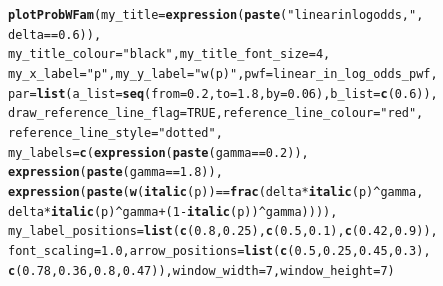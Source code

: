 \documentclass{article}\usepackage[]{graphicx}\usepackage[]{color}
\makeatletter
\newcommand{\hlnum}[1]{\textcolor[rgb]{0.686,0.059,0.569}{#1}}%
\newcommand{\hlstr}[1]{\textcolor[rgb]{0.192,0.494,0.8}{#1}}%
\newcommand{\hlopt}[1]{\textcolor[rgb]{0,0,0}{#1}}%
\newcommand{\hlstd}[1]{\textcolor[rgb]{0.345,0.345,0.345}{#1}}%
\newcommand{\hlkwc}[1]{\textcolor[rgb]{0.333,0.667,0.333}{#1}}%
\newcommand{\hlkwd}[1]{\textcolor[rgb]{0.737,0.353,0.396}{\textbf{#1}}}%
\newenvironment{kframe}{%
 \def\at@end@of@kframe{}%
 \ifinner\ifhmode%
  \def\at@end@of@kframe{\end{minipage}}%
  \begin{minipage}{\columnwidth}%
 \fi\fi%
 \def\FrameCommand##1{\hskip\@totalleftmargin \hskip-\fboxsep
 \colorbox{shadecolor}{##1}\hskip-\fboxsep
     \hskip-\linewidth \hskip-\@totalleftmargin \hskip\columnwidth}%
 \MakeFramed {\advance\hsize-\width
   \@totalleftmargin\z@ \linewidth\hsize
   \@setminipage}}%
 {\par\unskip\endMakeFramed%
 \at@end@of@kframe}
\newenvironment{knitrout}{}{} %
\makeatother
\begin{document}
\begin{knitrout}
\color{fgcolor}\begin{kframe}
\begin{alltt}
\hlkwd{plotProbWFam}\hlstd{(}\hlkwc{my_title}\hlstd{=}\hlkwd{expression}\hlstd{(}\hlkwd{paste}\hlstd{(}\hlstr{"linear in log odds,  "}\hlstd{,}
        \hlstd{delta} \hlopt{==} \hlnum{0.6}\hlstd{)),}
        \hlkwc{my_title_colour}\hlstd{=}\hlstr{"black"}\hlstd{,} \hlkwc{my_title_font_size}\hlstd{=}\hlnum{4}\hlstd{,}
        \hlkwc{my_x_label} \hlstd{=} \hlstr{"p"}\hlstd{,} \hlkwc{my_y_label} \hlstd{=} \hlstr{"w(p)"}\hlstd{,} \hlkwc{pwf}\hlstd{=linear_in_log_odds_pwf,}
        \hlkwc{par}\hlstd{=}\hlkwd{list}\hlstd{(}\hlkwc{a_list}\hlstd{=}\hlkwd{seq}\hlstd{(}\hlkwc{from}\hlstd{=}\hlnum{0.2}\hlstd{,} \hlkwc{to}\hlstd{=}\hlnum{1.8}\hlstd{,} \hlkwc{by}\hlstd{=}\hlnum{0.06}\hlstd{),} \hlkwc{b_list}\hlstd{=}\hlkwd{c}\hlstd{(}\hlnum{0.6}\hlstd{)),}
        \hlkwc{draw_reference_line_flag}\hlstd{=}\hlnum{TRUE}\hlstd{,} \hlkwc{reference_line_colour}\hlstd{=}\hlstr{"red"}\hlstd{,}
        \hlkwc{reference_line_style}\hlstd{=}\hlstr{"dotted"}\hlstd{,}
        \hlkwc{my_labels}\hlstd{=}\hlkwd{c}\hlstd{(}\hlkwd{expression}\hlstd{(}\hlkwd{paste}\hlstd{(gamma} \hlopt{==} \hlnum{0.2}\hlstd{)),}
                \hlkwd{expression}\hlstd{(}\hlkwd{paste}\hlstd{(gamma} \hlopt{==} \hlnum{1.8}\hlstd{)),}
                \hlkwd{expression}\hlstd{(}\hlkwd{paste}\hlstd{(}\hlkwd{w}\hlstd{(}\hlkwd{italic}\hlstd{(p))} \hlopt{==} \hlkwd{frac}\hlstd{(delta} \hlopt{*} \hlkwd{italic}\hlstd{(p)}\hlopt{^}\hlstd{gamma,}
                        \hlstd{delta} \hlopt{*} \hlkwd{italic}\hlstd{(p)}\hlopt{^}\hlstd{gamma} \hlopt{+} \hlstd{(}\hlnum{1}\hlopt{-}\hlkwd{italic}\hlstd{(p))}\hlopt{^}\hlstd{gamma)))),}
        \hlkwc{my_label_positions}\hlstd{=}\hlkwd{list}\hlstd{(}\hlkwd{c}\hlstd{(}\hlnum{0.8}\hlstd{,}\hlnum{0.25}\hlstd{),}\hlkwd{c}\hlstd{(}\hlnum{0.5}\hlstd{,}\hlnum{0.1}\hlstd{),}\hlkwd{c}\hlstd{(}\hlnum{0.42}\hlstd{,} \hlnum{0.9}\hlstd{)),}
        \hlkwc{font_scaling}\hlstd{=}\hlnum{1.0}\hlstd{,} \hlkwc{arrow_positions} \hlstd{=} \hlkwd{list}\hlstd{(}\hlkwd{c}\hlstd{(}\hlnum{0.5}\hlstd{,}\hlnum{0.25}\hlstd{,}\hlnum{0.45}\hlstd{,}\hlnum{0.3}\hlstd{),}
                \hlkwd{c}\hlstd{(}\hlnum{0.78}\hlstd{,}\hlnum{0.36}\hlstd{,}\hlnum{0.8}\hlstd{,}\hlnum{0.47}\hlstd{)),} \hlkwc{window_width}\hlstd{=}\hlnum{7}\hlstd{,} \hlkwc{window_height}\hlstd{=}\hlnum{7}\hlstd{)}
\end{alltt}
\end{kframe}


\end{knitrout}
\end{document}
